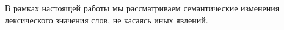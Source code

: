 \documentclass[LI,VKR]{HSEUniversity}
\begin{document}
В рамках настоящей работы мы рассматриваем семантические изменения
лексического значения слов, не касаясь иных явлений.

%
\end{document}
